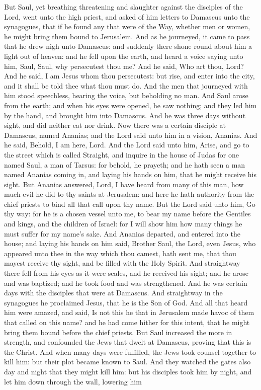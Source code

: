 But Saul, yet breathing threatening and slaughter against the disciples of the Lord, went unto the high priest, and asked of him letters to Damascus unto the synagogues, that if he found any that were of the Way, whether men or women, he might bring them bound to Jerusalem. And as he journeyed, it came to pass that he drew nigh unto Damascus: and suddenly there shone round about him a light out of heaven: and he fell upon the earth, and heard a voice saying unto him, Saul, Saul, why persecutest thou me? And he said, Who art thou, Lord? And he said, I am Jesus whom thou persecutest: but rise, and enter into the city, and it shall be told thee what thou must do. And the men that journeyed with him stood speechless, hearing the voice, but beholding no man. And Saul arose from the earth; and when his eyes were opened, he saw nothing; and they led him by the hand, and brought him into Damascus. And he was three days without sight, and did neither eat nor drink.  Now there was a certain disciple at Damascus, named Ananias; and the Lord said unto him in a vision, Ananias. And he said, Behold, I am here, Lord. And the Lord said unto him, Arise, and go to the street which is called Straight, and inquire in the house of Judas for one named Saul, a man of Tarsus: for behold, he prayeth; and he hath seen a man named Ananias coming in, and laying his hands on him, that he might receive his sight. But Ananias answered, Lord, I have heard from many of this man, how much evil he did to thy saints at Jerusalem: and here he hath authority from the chief priests to bind all that call upon thy name. But the Lord said unto him, Go thy way: for he is a chosen vessel unto me, to bear my name before the Gentiles and kings, and the children of Israel: for I will show him how many things he must suffer for my name’s sake. And Ananias departed, and entered into the house; and laying his hands on him said, Brother Saul, the Lord, even Jesus, who appeared unto thee in the way which thou camest, hath sent me, that thou mayest receive thy sight, and be filled with the Holy Spirit. And straightway there fell from his eyes as it were scales, and he received his sight; and he arose and was baptized; and he took food and was strengthened. And he was certain days with the disciples that were at Damascus. And straightway in the synagogues he proclaimed Jesus, that he is the Son of God. And all that heard him were amazed, and said, Is not this he that in Jerusalem made havoc of them that called on this name? and he had come hither for this intent, that he might bring them bound before the chief priests. But Saul increased the more in strength, and confounded the Jews that dwelt at Damascus, proving that this is the Christ.  And when many days were fulfilled, the Jews took counsel together to kill him: but their plot became known to Saul. And they watched the gates also day and night that they might kill him: but his disciples took him by night, and let him down through the wall, lowering him 